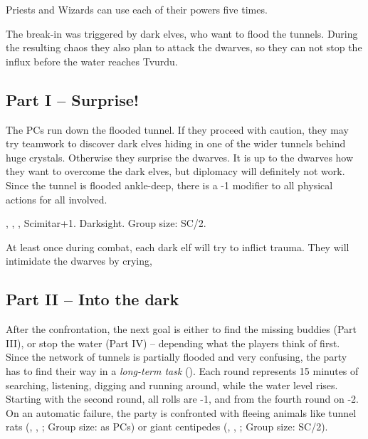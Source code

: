 {		

		\noindent
		Priests and Wizards can use each of their powers five times.


		\noindent
		The break-in was triggered by dark elves, who want to flood the tunnels. During the resulting chaos they also plan to attack the dwarves, so they can not stop the influx before the water reaches Tvurdu.

		\subsection{Part I -- Surprise!}

		\noindent
		The PCs run down the flooded tunnel. If they proceed with caution, they may try teamwork to discover dark elves hiding in one of the wider tunnels behind huge crystals. Otherwise they surprise the dwarves. It is up to the dwarves how they want to overcome the dark elves, but diplomacy will definitely not work. Since the tunnel is flooded ankle-deep, there is a -1 modifier to all physical actions for all involved.

		 , , , Scimitar+1. Darksight. Group size: SC/2.

		At least once during combat, each dark elf will try to inflict trauma. They will intimidate the dwarves by crying, 

		\subsection{Part II -- Into the dark}

		After the confrontation, the next goal is either to find the missing buddies (Part III), or stop the water (Part IV) -- depending what the players think of first. Since the network of tunnels is partially flooded and very confusing, the party has to find their way in a \emph{long-term task} (). Each round represents 15 minutes of searching, listening, digging and running around, while the water level rises. Starting with the second round, all rolls are -1, and from the fourth round on -2. On an automatic failure, the party is confronted with fleeing animals like tunnel rats (, , ; Group size: as PCs) or giant centipedes (, , ; Group size: SC/2).

}
